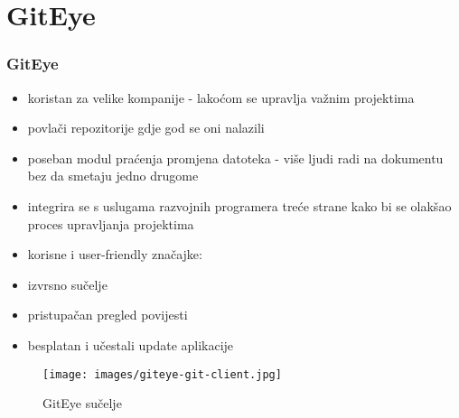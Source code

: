 \section{GitEye}
\begin{frame}[allowframebreaks]
\frametitle{GitEye}
 
\begin{itemize}
 \item koristan za velike kompanije - lakoćom se upravlja važnim projektima
 \item povlači repozitorije gdje god se oni nalazili
 \item poseban modul praćenja promjena datoteka - više ljudi radi na dokumentu bez da smetaju jedno drugome
 \item integrira se s uslugama razvojnih programera treće strane kako bi se olakšao proces upravljanja projektima
 \framebreak
 \item korisne i user-friendly značajke:
 		\item izvrsno sučelje
 		\item pristupačan pregled povijesti
 		\item besplatan i učestali update aplikacije
\end{itemize}


\end{frame}

\begin{figure}
	\texttt{[image: images/giteye-git-client.jpg]}
	\caption{GitEye sučelje}
\end{figure}
